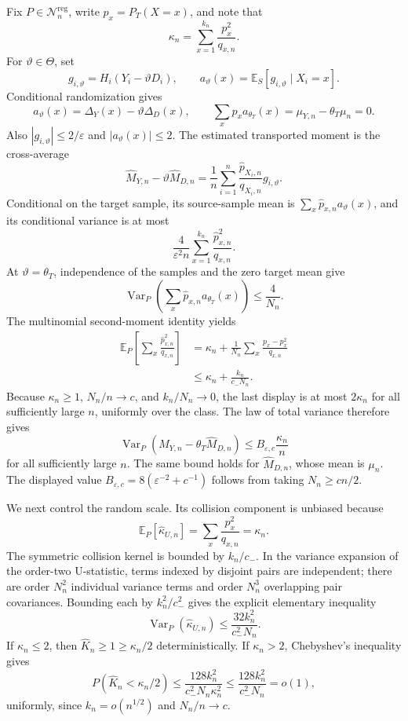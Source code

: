 Fix \(P\in\mathcal N_n^{\mathrm{reg}}\), write \(p_x=P_T(X=x)\), and note that
\[
 \kappa_n=\sum_{x=1}^{k_n}\frac{p_x^2}{q_{x,n}}.
\]
For \(\vartheta\in\Theta\), set
\[
 g_{i,\vartheta}=H_i(Y_i-\vartheta D_i),
 \qquad a_\vartheta(x)=\mathbb E_S[g_{i,\vartheta}\mid X_i=x].
\]
Conditional randomization gives
\[
 a_\vartheta(x)=\Delta_Y(x)-\vartheta\Delta_D(x),
 \qquad
 \sum_xp_xa_{\theta_T}(x)=\mu_{Y,n}-\theta_T\mu_n=0.
\]
Also \(|g_{i,\vartheta}|\le2/\varepsilon\) and \(|a_\vartheta(x)|\le2\).  The estimated transported moment is the cross-average
\[
 \widehat M_{Y,n}-\vartheta\widehat M_{D,n}
 =\frac1n\sum_{i=1}^n
 \frac{\widehat p_{X_i,n}}{q_{X_i,n}}g_{i,\vartheta}.
\]
Conditional on the target sample, its source-sample mean is \(\sum_x\widehat p_{x,n}a_\vartheta(x)\), and its conditional variance is at most
\[
 \frac{4}{\varepsilon^2n}
 \sum_{x=1}^{k_n}\frac{\widehat p_{x,n}^2}{q_{x,n}}.
\]
At \(\vartheta=\theta_T\), independence of the samples and the zero target mean give
\[
 \operatorname{Var}_P\left(\sum_x\widehat p_{x,n}a_{\theta_T}(x)\right)
 \le\frac4{N_n}.
\]
The multinomial second-moment identity yields
\[
 \begin{aligned}
 \mathbb E_P\left[\sum_x\frac{\widehat p_{x,n}^2}{q_{x,n}}\right]
 &=\kappa_n+\frac1{N_n}\sum_x\frac{p_x-p_x^2}{q_{x,n}}\\
 &\le\kappa_n+\frac{k_n}{c_-N_n}.
 \end{aligned}
\]
Because \(\kappa_n\ge1\), \(N_n/n\to c\), and \(k_n/N_n\to0\), the last display is at most \(2\kappa_n\) for all sufficiently large \(n\), uniformly over the class.  The law of total variance therefore gives
\[
 \operatorname{Var}_P(\widehat M_{Y,n}-\theta_T\widehat M_{D,n})
 \le B_{\varepsilon,c}\frac{\kappa_n}{n}
\]
for all sufficiently large \(n\).  The same bound holds for \(\widehat M_{D,n}\), whose mean is \(\mu_n\).  The displayed value \(B_{\varepsilon,c}=8(\varepsilon^{-2}+c^{-1})\) follows from taking \(N_n\ge cn/2\).

We next control the random scale.  Its collision component is unbiased because
\[
 \mathbb E_P[\widehat\kappa_{U,n}]
 =\sum_x\frac{p_x^2}{q_{x,n}}=\kappa_n.
\]
The symmetric collision kernel is bounded by \(k_n/c_-\).  In the variance expansion of the order-two U-statistic, terms indexed by disjoint pairs are independent; there are order \(N_n^2\) individual variance terms and order \(N_n^3\) overlapping pair covariances.  Bounding each by \(k_n^2/c_-^2\) gives the explicit elementary inequality
\[
 \operatorname{Var}_P(\widehat\kappa_{U,n})
 \le\frac{32k_n^2}{c_-^2N_n}.
\]
If \(\kappa_n\le2\), then \(\widehat K_n\ge1\ge\kappa_n/2\) deterministically.  If \(\kappa_n>2\), Chebyshev's inequality gives
\[
 P(\widehat K_n<\kappa_n/2)
 \le\frac{128k_n^2}{c_-^2N_n\kappa_n^2}
 \le\frac{128k_n^2}{c_-^2N_n}=o(1),
\]
uniformly, since \(k_n=o(n^{1/2})\) and \(N_n/n\to c\).

